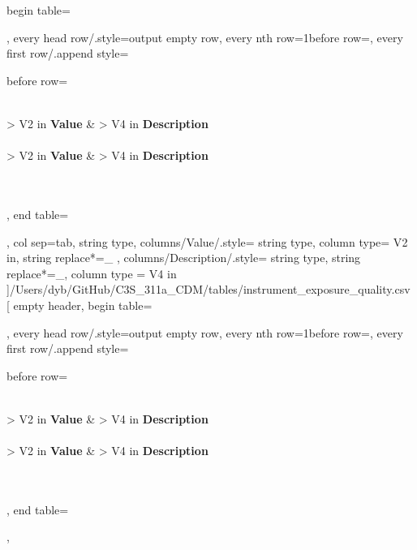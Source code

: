 \documentclass[a4paper]{article}
\begin{document}
    begin table=\begin{longtable},
    every head row/.style={output empty row},
    every nth row={1}{before row=\hline},
    every first row/.append style={
        before row={%
            \caption{Instrument exposure quality}
            \label{tab:DataTable}\\
            \hline\hline {} { > {\centering}V{2 in}} { \textbf{Value}} &  { > {\centering} V{4 in} } {\textbf{Description}} \\ \hline\hline \endfirsthead
             \\
            \hline\hline {} { > {\centering}V{2 in} } { \textbf{Value}} &  { > {\centering} V{4 in} } {\textbf{Description}} \\ \hline\hline \endhead
             \\
            \endfoot
            \hline
             \\ 
            \endlastfoot
        }
    },
    end table=\end{longtable},
    col sep=tab,
    string type,
    columns/Value/.style={
            string type, 
            column type= V{2 in}, 
            string replace*={_}{}
        },
    columns/Description/.style={
            string type, 
            string replace*={_}{},
            column type = V{4 in}
        }
    ]{/Users/dyb/GitHub/C3S_311a_CDM/tables/instrument_exposure_quality.csv}
\pgfplotstabletypeset[
    empty header,
    begin table=\begin{longtable},
    every head row/.style={output empty row},
    every nth row={1}{before row=\hline},
    every first row/.append style={
        before row={%
            \caption{Location method}
            \label{tab:DataTable}\\
            \hline\hline {} { > {\centering}V{2 in}} { \textbf{Value}} &  { > {\centering} V{4 in} } {\textbf{Description}} \\ \hline\hline \endfirsthead
             \\
            \hline\hline {} { > {\centering}V{2 in} } { \textbf{Value}} &  { > {\centering} V{4 in} } {\textbf{Description}} \\ \hline\hline \endhead
             \\
            \endfoot
            \hline
             \\ 
            \endlastfoot
        }
    },
    end table=\end{longtable},
\end{document}
